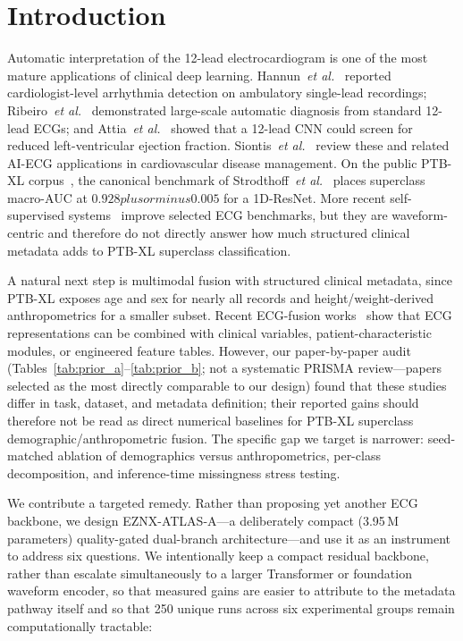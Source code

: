\documentclass[mathematics,article,pdftex]{Definitions/mdpi}
\def\textbf#1{#1}%
\def\emph#1{#1}%
\def\pm{plus or minus }%
\begin{document}
\section{Introduction}\label{sec:intro}

Automatic interpretation of the 12-lead electrocardiogram is one of the most mature applications of clinical deep learning. Hannun~\textit{et al.}~\cite{Hannun2019} reported cardiologist-level arrhythmia detection on ambulatory single-lead recordings; Ribeiro~\textit{et al.}~\cite{Ribeiro2020} demonstrated large-scale automatic diagnosis from standard 12-lead ECGs; and Attia~\textit{et al.}~\cite{Attia2019LV} showed that a 12-lead CNN could screen for reduced left-ventricular ejection fraction. Siontis~\textit{et al.}~\cite{Siontis2021} review these and related AI-ECG applications in cardiovascular disease management. On the public PTB-XL corpus~\cite{Wagner2020}, the canonical benchmark of Strodthoff~\textit{et al.}~\cite{Strodthoff2021} places superclass macro-AUC at $0.928 \pm 0.005$ for a 1D-ResNet. More recent self-supervised systems~\cite{Mehari2022, Weimann2025, Coppola2024, Nguyen2025} improve selected ECG benchmarks, but they are waveform-centric and therefore do not directly answer how much structured clinical metadata adds to PTB-XL superclass classification.

A natural next step is \emph{multimodal fusion} with structured clinical metadata, since PTB-XL exposes age and sex for nearly all records and height/weight-derived anthropometrics for a smaller subset. Recent ECG-fusion works~\cite{Qiu2024, Srivastava2025, Atwa2025, Holloway2026} show that ECG representations can be combined with clinical variables, patient-characteristic modules, or engineered feature tables. However, our paper-by-paper audit (Tables~\ref{tab:prior_a}--\ref{tab:prior_b}; not a systematic PRISMA review---papers selected as the most directly comparable to our design) found that these studies differ in task, dataset, and metadata definition; their reported gains should therefore not be read as direct numerical baselines for PTB-XL superclass demographic/anthropometric fusion. The specific gap we target is narrower: seed-matched ablation of demographics versus anthropometrics, per-class decomposition, and inference-time missingness stress testing.

We contribute a targeted remedy. Rather than proposing yet another ECG backbone, we design \textbf{EZNX-ATLAS-A}---a deliberately compact (3.95\,M parameters) quality-gated dual-branch architecture---and use it as an \emph{instrument} to address six questions. We intentionally keep a compact residual backbone, rather than escalate simultaneously to a larger Transformer or foundation waveform encoder, so that measured gains are easier to attribute to the metadata pathway itself and so that 250 unique runs across six experimental groups remain computationally tractable:
\end{document}
